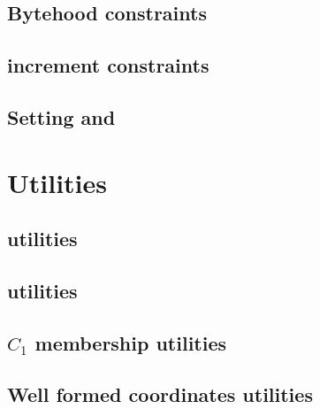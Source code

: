 \subsection{Bytehood constraints}                                           \label{ec data: bytehood and accumulator}                           
\subsection{\ecdataId{} increment constraints}                              \label{ec data: stamp increments}                                   
\subsection{Setting \notOnGTwo{} and \notOnGTwoAcc{}}                       \label{ec data: this point is not on G2 and acc}                    

\section{Utilities}                                                                                                                             
\subsection{\wcpMod{} utilities}                                            \label{ec data: wcp utilities}                                      
\subsection{\extMod{} utilities}                                            \label{ec data: ext utilities}                                      
\subsection{$C_1$ membership utilities}                                     \label{ec data: c1 membership utilities}                            
\subsection{Well formed coordinates utilities}                              \label{ec data: c2 membership maybe utilities}                      

